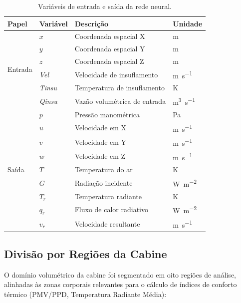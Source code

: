 \documentclass[12pt, a4paper]{article}
\begin{document}
\begin{table}[htb]
\centering
\caption{Variáveis de entrada e saída da rede neural.}
\label{tab:variaveis}
\begin{tabular}{@{}llll@{}}
\toprule
\textbf{Papel} & \textbf{Variável} & \textbf{Descrição} & \textbf{Unidade} \\
\midrule
\multirow{6}{*}{Entrada}
  & $x$ & Coordenada espacial X & \si{\metre} \\
  & $y$ & Coordenada espacial Y & \si{\metre} \\
  & $z$ & Coordenada espacial Z & \si{\metre} \\
  & \textit{Vel}   & Velocidade de insuflamento & \si{\metre\per\second} \\
  & \textit{Tinsu} & Temperatura de insuflamento & \si{\kelvin} \\
  & \textit{Qinsu} & Vazão volumétrica de entrada & \si{\metre\cubed\per\second} \\
\midrule
\multirow{9}{*}{Saída}
  & $p$      & Pressão manométrica         & \si{\pascal} \\
  & $u$      & Velocidade em X             & \si{\metre\per\second} \\
  & $v$      & Velocidade em Y             & \si{\metre\per\second} \\
  & $w$      & Velocidade em Z             & \si{\metre\per\second} \\
  & $T$      & Temperatura do ar           & \si{\kelvin} \\
  & $G$      & Radiação incidente          & \si{\watt\per\metre\squared} \\
  & $T_{r}$  & Temperatura radiante        & \si{\kelvin} \\
  & $q_{r}$  & Fluxo de calor radiativo    & \si{\watt\per\metre\squared} \\
  & $v_{r}$  & Velocidade resultante       & \si{\metre\per\second} \\
\bottomrule
\end{tabular}
\end{table}

\subsection{Divisão por Regiões da Cabine}
\label{sec:regioes}

O domínio volumétrico da cabine foi segmentado em oito regiões de análise,
alinhadas às zonas corporais relevantes para o cálculo de índices de conforto
térmico (PMV/PPD, Temperatura Radiante Média):
\end{document}
